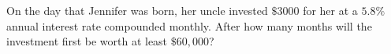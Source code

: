 On the day that Jennifer was born, her uncle invested $\$3000$ for her at a $5.8\%$ annual interest rate compounded monthly. After how many months will the investment first be worth at least $\$60{,}000$?
